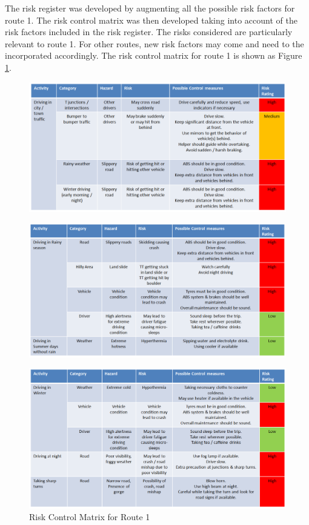 \documentclass[paper=letter, fontsize=12pt]{article}
\begin{document}
The risk register was developed by augmenting all the possible risk factors for route 1. The risk control matrix was then developed taking into account of the risk factors included in the risk register. The risks considered are particularly relevant to route 1. For other routes, new risk factors may come and need to the incorporated accordingly. The risk control matrix for route 1 is shown as Figure \ref{rcm}.

\begin{figure}[htpb]
    \centering
    \includegraphics[scale = 0.412]{jrm1}
 
\end{figure}

\begin{figure}[htpb]
    \centering
    \includegraphics[scale = 0.4]{jrm2}
  
\end{figure}

\begin{figure}[htpb]
    \centering
    \includegraphics[scale = 0.4]{jrm3}
    \caption{Risk Control Matrix for Route 1}
    \label{rcm}
\end{figure}
\end{document}
